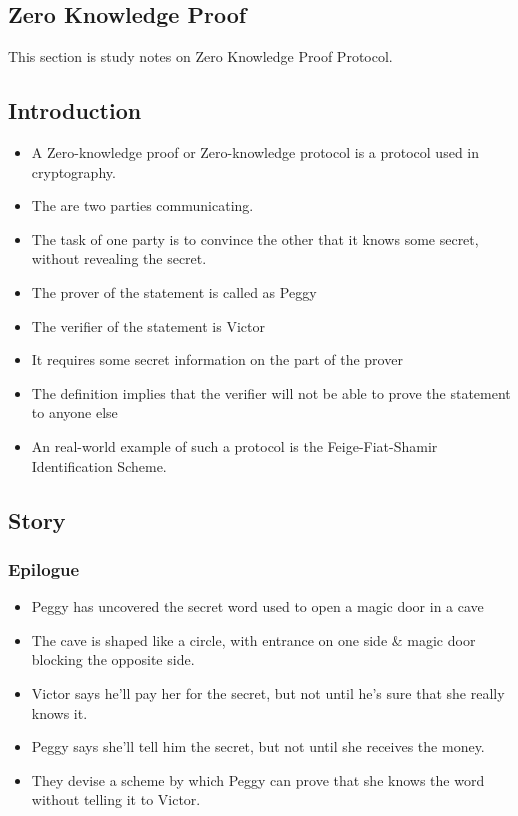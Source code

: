 \documentclass[12pt]{article}
\begin{document}
%
%

\pagebreak
\vspace*{\fill}
\begin{center}
\section{Zero Knowledge Proof}
This section is study notes on Zero Knowledge Proof Protocol.
\end{center}
\vspace*{\fill}
\pagebreak

\subsection{Introduction}
\begin{itemize}
\item A Zero-knowledge proof or Zero-knowledge protocol is a protocol used in cryptography. 
\item The are two parties communicating. 
\item The task of one party is to convince the other that it knows some secret, without revealing the secret.
\item The prover of the statement is called as Peggy 
\item The verifier of the statement is Victor 
\item It requires some secret information on the part of the prover
\item The definition implies that the verifier will not be able to prove the statement to anyone else
\item An real-world example of such a protocol is the Feige-Fiat-Shamir Identification Scheme.
\end{itemize}

\subsection{Story}
\subsubsection{Epilogue}
\begin{itemize}
\item Peggy has uncovered the secret word used to open a magic door in a cave
\item The cave is shaped like a circle, with entrance on one side \& magic door blocking the opposite side.
\item Victor says he'll pay her for the secret, but not until he's sure that she really knows it.
\item Peggy says she'll tell him the secret, but not until she receives the money.
\item They devise a scheme by which Peggy can prove that she knows the word without telling it to Victor.
\end{itemize}
\end{document}

